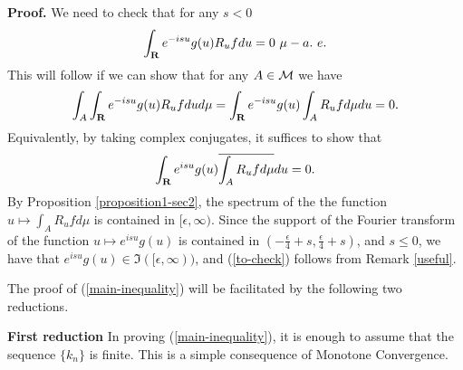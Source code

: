 {\bf Proof.}  We need to check that for any $s<0$
$$
\int_\R e^{-isu} g(u) R_u f d u=0\ \mu - a.\ e.
$$
This will follow if we can show that for any
$A\in {\cal M}$ we have
$$
\int_A\int_\R e^{-isu} g(u) R_u f d ud\mu=
\int_\R  e^{-isu} g(u) \int_A R_u f d\mu du
=0.
$$
Equivalently, by taking complex conjugates, 
it suffices to show that
\begin{equation}
\int_\R e^{isu} g(u)
\overline{ \int_A R_u f d\mu} d u=0.
\label{to-check}
\end{equation}
By Proposition \ref{proposition1-sec2}, 
the spectrum of the
the function $u\mapsto \int_A R_u f d\mu$
is contained in $[\epsilon, \infty)$.
Since the support of the Fourier transform
of the function $u\mapsto e^{isu} g(u)$
is contained in $(-\frac{\epsilon}{4}+s,\frac{\epsilon}{4}+s)$,
and $s\leq 0$, we have that 
$e^{isu} g(u)\in \Im([\epsilon,\infty))$,
and (\ref{to-check}) follows from 
Remark \ref{useful}.

The proof of 
(\ref{main-inequality}) will be facilitated
 by the following 
two reductions.

{\bf First reduction}  In proving (\ref{main-inequality}),
it is enough to assume that the sequence $\{k_n\}$ is finite.
This is a simple consequence of Monotone Convergence.  

